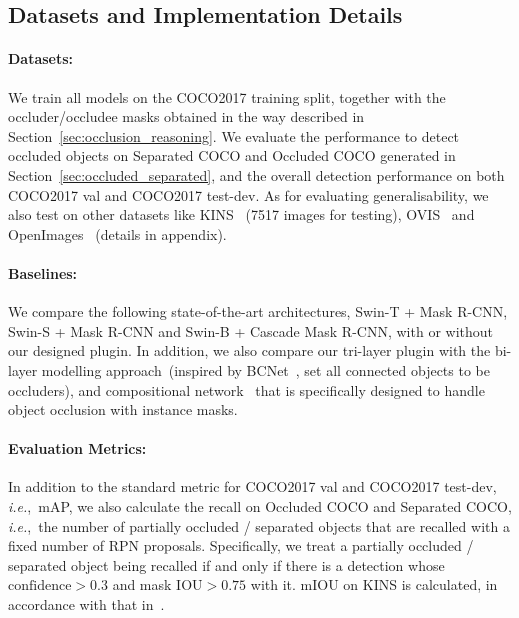 \documentclass{bmvc2k}
\begin{document}
\subsection{Datasets and Implementation Details}
\label{sec:implementation_details}
\vspace{-0.1cm}

\paragraph{Datasets:} 
We train all models on the COCO2017 training split, 
together with the occluder/occludee masks obtained in the way described in Section~\ref{sec:occlusion_reasoning}.
We evaluate the performance to detect occluded objects on Separated COCO and Occluded COCO generated in Section~\ref{sec:occluded_separated}, and the overall detection performance on both COCO2017 val and COCO2017 test-dev. 
As for evaluating generalisability, we also test on other datasets like KINS~\cite{qi2019kins} (7517 images for testing), OVIS~\cite{qi2022ovis} and OpenImages~\cite{openimages_2020} (details in appendix). \\[-0.8cm]

\paragraph{Baselines:} 
We compare the following state-of-the-art architectures,
 Swin-T + Mask R-CNN, Swin-S + Mask R-CNN and Swin-B + Cascade Mask R-CNN, with or without our designed plugin. 
In addition, we also compare our tri-layer plugin with the bi-layer modelling approach~(inspired by BCNet~\cite{ke2021bcnet}, set all connected objects to be occluders), and compositional network~\cite{yuan2021robust} that is specifically designed to handle object occlusion with instance masks. \\[-0.8cm]

\paragraph{Evaluation Metrics:} 
In addition to the standard metric for COCO2017 val and COCO2017 test-dev,
{\em i.e.},~mAP, we also calculate the recall on Occluded COCO and Separated COCO, 
\emph{i.e.},~the number of partially occluded / separated objects that are recalled with a fixed number of RPN proposals. 
Specifically, we treat a partially occluded / separated object being recalled if and only if there is a detection whose $\text{confidence} > 0.3$ and mask $\text{IOU} > 0.75$ with it. 
mIOU on KINS is calculated, in accordance with that in~\cite{yuan2021robust}.\\[-0.6cm]
\end{document}
